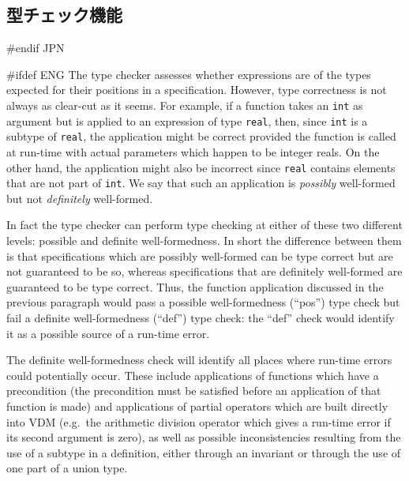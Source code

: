 \documentclass[\pformat,12pt]{article}
\newcommand{\aaa}{\tt }
\begin{document}
\subsection{型チェック機能}\label{sec:tc}
\label{sec:def-typechedk}\label{type check} 
#endif JPN

#ifdef ENG
The type checker assesses whether expressions are of the types
expected for their positions in a specification. However, type
correctness is not always as clear-cut as it seems. For example, if a
function takes an {\aaa int} as argument but is applied to an
expression of type {\aaa real}, then, since {\aaa int} is a subtype of
{\aaa real}, the application might be correct
provided the function is called at run-time with actual parameters
which happen to be integer reals. On the other hand, the application
might also be incorrect since {\aaa real} contains elements that are
not part of {\aaa int}. We say that such an application is {\em
  possibly\/} well-formed but not {\em definitely\/} well-formed.

In fact the type checker can perform type checking at either of these
two different levels: possible and definite well-formedness. In short
the difference between them is that specifications which are possibly
well-formed can be type correct but are not guaranteed to be so,
whereas specifications that are definitely well-formed are guaranteed
to be type correct. Thus, the function
application discussed in the previous paragraph  would pass a possible
well-formedness (``pos'') type check 
but fail a definite well-formedness (``def'') type check: 
the ``def'' check would identify it as a possible source of a run-time error.

The definite well-formedness check  will identify all places where
run-time errors could potentially occur. These include applications of
functions which have a precondition (the precondition must be
satisfied before an application of that function is made) and
applications of partial operators which are built directly into VDM
(e.g.\ the arithmetic division operator which gives a run-time error
if its second argument is zero), as well as possible inconsistencies
resulting from the use of a subtype in a definition, either through an
invariant or through the use of one part of a union type.
\end{document}
